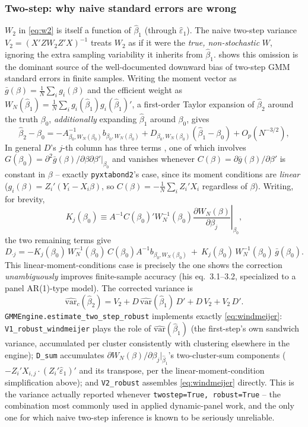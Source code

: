 \documentclass[11pt,a4paper]{article}
\newcommand{\pkg}{\texttt{pyxtabond2}}
\newcommand{\bigO}{O}
\begin{document}
\subsubsection{Two-step: why naive standard errors are wrong}

$W_2$ in \eqref{eq:w2} is itself a function of $\hat\beta_1$ (through
$\hat\varepsilon_1$). The naive two-step variance
$V_2=(X'ZW_2Z'X)^{-1}$ treats $W_2$ as if it were the \emph{true,
non-stochastic} $W$, ignoring the extra sampling variability it inherits
from $\hat\beta_1$. \citet{Windmeijer2005} shows this omission is the
dominant source of the well-documented downward bias of two-step GMM
standard errors in finite samples. Writing the moment vector as
$\bar g(\beta)=\frac1N\sum_i g_i(\beta)$ and the efficient weight as
$W_N(\hat\beta_1)=\frac1N\sum_i g_i(\hat\beta_1)g_i(\hat\beta_1)'$, a
first-order Taylor expansion of $\hat\beta_2$ around the truth $\beta_0$,
\emph{additionally} expanding $\hat\beta_1$ around $\beta_0$, gives
\citep[eq.\ 2.3--2.4]{Windmeijer2005}
\[
  \hat\beta_2-\beta_0 = -A_{\beta_0,W_N(\beta_0)}^{-1}b_{\beta_0,W_N(\beta_0)}
    + D_{\beta_0,W_N(\beta_0)}\left(\hat\beta_1-\beta_0\right) + \bigO_p(N^{-3/2}),
\]
In general $D$'s $j$-th column has three terms \citep[eq.\ 2.3]{Windmeijer2005},
one of which involves $G(\beta_0)=\partial^2\bar g(\beta)/\partial\beta\partial\beta'|_{\beta_0}$
and vanishes whenever $C(\beta)=\partial\bar g(\beta)/\partial\beta'$ is
constant in $\beta$ -- exactly \pkg{}'s case, since its moment conditions are
\emph{linear} ($g_i(\beta)=Z_i'(Y_i-X_i\beta)$, so
$C(\beta)=-\frac1N\sum_iZ_i'X_i$ regardless of $\beta$). Writing, for
brevity,
\[
  K_j(\beta_0) \equiv A^{-1}C(\beta_0)'W_N^{-1}(\beta_0)\left.\frac{\partial W_N(\beta)}{\partial\beta_j}\right|_{\beta_0},
\]
the two remaining terms give
\[
  D_{\cdot j} = -K_j(\beta_0)\,W_N^{-1}(\beta_0)\,C(\beta_0)A^{-1}b_{\beta_0,W_N(\beta_0)}
    \ +\ K_j(\beta_0)\,W_N^{-1}(\beta_0)\,\bar g(\beta_0).
\]
This linear-moment-conditions case is precisely the one
\citet{Windmeijer2005} shows the correction \emph{unambiguously} improves
finite-sample accuracy (his eq.\ 3.1--3.2, specialized to a panel AR(1)-type
model). The corrected variance is
\begin{equation}
  \widehat{\mathrm{var}}_c(\hat\beta_2) = V_2 + D\,\widehat{\mathrm{var}}(\hat\beta_1)\,D'
    + D\,V_2 + V_2\,D'. \label{eq:windmeijer}
\end{equation}
\texttt{GMMEngine.estimate\_two\_step\_robust} implements exactly
\eqref{eq:windmeijer}: \texttt{V1\_robust\_windmeijer} plays the role of
$\widehat{\mathrm{var}}(\hat\beta_1)$ (the first-step's own sandwich
variance, accumulated per cluster consistently with clustering elsewhere in
the engine); \texttt{D\_sum} accumulates
$\partial W_N(\beta)/\partial\beta_j|_{\hat\beta_1}$'s two-cluster-sum
components ($-Z_i'X_{i,j}\cdot(Z_i'\hat\varepsilon_1)'$ and its transpose,
per the linear-moment-condition simplification above); and
\texttt{V2\_robust} assembles \eqref{eq:windmeijer} directly. This is the
variance actually reported whenever \texttt{twostep=True, robust=True} --
the combination most commonly used in applied dynamic-panel work, and the
only one for which naive two-step inference is known to be seriously
unreliable.
\end{document}
